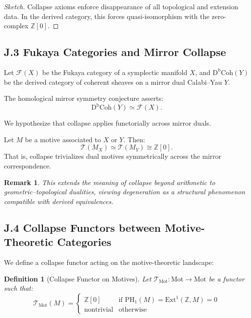\documentclass[11pt]{article}
\newtheorem{definition}[theorem]{Definition}
\newtheorem{remark}[theorem]{Remark}
\begin{document}
\begin{proof}[Sketch]
Collapse axioms enforce disappearance of all topological and extension data.  
In the derived category, this forces quasi-isomorphism with the zero-complex $\mathbb{Z}[0]$.
\end{proof}

\subsection*{J.3 Fukaya Categories and Mirror Collapse}

Let $\mathcal{F}(X)$ be the Fukaya category of a symplectic manifold $X$, and $\mathrm{D^bCoh}(Y)$ be the derived category of coherent sheaves  
on a mirror dual Calabi–Yau $Y$.

The homological mirror symmetry conjecture asserts:
\[
\mathrm{D^bCoh}(Y) \simeq \mathcal{F}(X).
\]

We hypothesize that collapse applies functorially across mirror duals.

\begin{conjecture}
Let $M$ be a motive associated to $X$ or $Y$. Then:
\[
\mathcal{T}(M_X) \simeq \mathcal{T}(M_Y) \cong \mathbb{Z}[0].
\]
That is, collapse trivializes dual motives symmetrically across the mirror correspondence.
\end{conjecture}

\begin{remark}
This extends the meaning of collapse beyond arithmetic to geometric–topological dualities,  
viewing degeneration as a structural phenomenon compatible with derived equivalences.
\end{remark}

\subsection*{J.4 Collapse Functors between Motive-Theoretic Categories}

We define a collapse functor acting on the motive-theoretic landscape:

\begin{definition}[Collapse Functor on Motives]
Let $\mathcal{T}_{\mathrm{Mot}} : \text{Mot} \to \text{Mot}$ be a functor such that:
\[
\mathcal{T}_{\mathrm{Mot}}(M) =
\begin{cases}
\mathbb{Z}[0] & \text{if } \mathrm{PH}_1(M) = \mathrm{Ext}^1(\mathbb{Z}, M) = 0 \\
\text{nontrivial} & \text{otherwise}
\end{cases}
\]
\end{definition}
\end{document}

